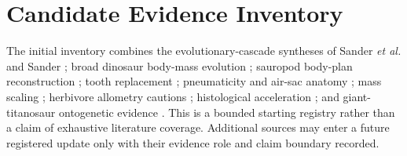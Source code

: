 \documentclass[conference]{IEEEtran}
\begin{document}
\section{Candidate Evidence Inventory}

The initial inventory combines the evolutionary-cascade syntheses of Sander \emph{et al.} \cite{sander2010} and Sander \cite{sander2013}; broad dinosaur body-mass evolution \cite{benson2014}; sauropod body-plan reconstruction \cite{bates2016}; tooth replacement \cite{demic2013}; pneumaticity and air-sac anatomy \cite{wedel2009,sereno2008}; mass scaling \cite{campione2012}; herbivore allometry cautions \cite{clauss2013}; histological acceleration \cite{sander2004}; and giant-titanosaur ontogenetic evidence \cite{lacovara2014}. This is a bounded starting registry rather than a claim of exhaustive literature coverage. Additional sources may enter a future registered update only with their evidence role and claim boundary recorded.
\end{document}
